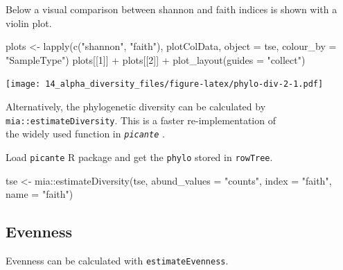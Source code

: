\documentclass[
]{book}
\newenvironment{Shaded}{\begin{snugshade}}{\end{snugshade}}
\newcommand{\AttributeTok}[1]{\textcolor[rgb]{0.77,0.63,0.00}{#1}}
\newcommand{\DecValTok}[1]{\textcolor[rgb]{0.00,0.00,0.81}{#1}}
\newcommand{\FunctionTok}[1]{\textcolor[rgb]{0.00,0.00,0.00}{#1}}
\newcommand{\NormalTok}[1]{#1}
\newcommand{\OtherTok}[1]{\textcolor[rgb]{0.56,0.35,0.01}{#1}}
\newcommand{\SpecialCharTok}[1]{\textcolor[rgb]{0.00,0.00,0.00}{#1}}
\newcommand{\StringTok}[1]{\textcolor[rgb]{0.31,0.60,0.02}{#1}}
\begin{document}
Below a visual comparison between shannon and faith indices is shown with a violin plot.

\begin{Shaded}
\begin{Highlighting}[]
\NormalTok{plots }\OtherTok{\textless{}{-}} \FunctionTok{lapply}\NormalTok{(}\FunctionTok{c}\NormalTok{(}\StringTok{"shannon"}\NormalTok{, }\StringTok{"faith"}\NormalTok{),}
\NormalTok{                plotColData,}
                \AttributeTok{object =}\NormalTok{ tse, }\AttributeTok{colour\_by =} \StringTok{"SampleType"}\NormalTok{)}
\NormalTok{plots[[}\DecValTok{1}\NormalTok{]] }\SpecialCharTok{+}\NormalTok{ plots[[}\DecValTok{2}\NormalTok{]] }\SpecialCharTok{+}
  \FunctionTok{plot\_layout}\NormalTok{(}\AttributeTok{guides =} \StringTok{"collect"}\NormalTok{)}
\end{Highlighting}
\end{Shaded}

\texttt{[image: 14\_alpha\_diversity\_files/figure-latex/phylo-div-2-1.pdf]}

Alternatively, the phylogenetic diversity can be calculated by \texttt{mia::estimateDiversity}. This is a faster re-implementation of\\
the widely used function in \emph{\texttt{picante}} \citep[\citet{Kembel2010}]{R-picante}.

Load \texttt{picante} R package and get the \texttt{phylo} stored in \texttt{rowTree}.

\begin{Shaded}
\begin{Highlighting}[]
\NormalTok{tse }\OtherTok{\textless{}{-}}\NormalTok{ mia}\SpecialCharTok{::}\FunctionTok{estimateDiversity}\NormalTok{(tse, }
                              \AttributeTok{abund\_values =} \StringTok{"counts"}\NormalTok{,}
                              \AttributeTok{index =} \StringTok{"faith"}\NormalTok{, }
                              \AttributeTok{name =} \StringTok{"faith"}\NormalTok{)}
\end{Highlighting}
\end{Shaded}

\hypertarget{evenness}{%
\subsection{Evenness}\label{evenness}}

Evenness can be calculated with \texttt{estimateEvenness}.

\begin{Shaded}
\end{Shaded}
\end{document}
